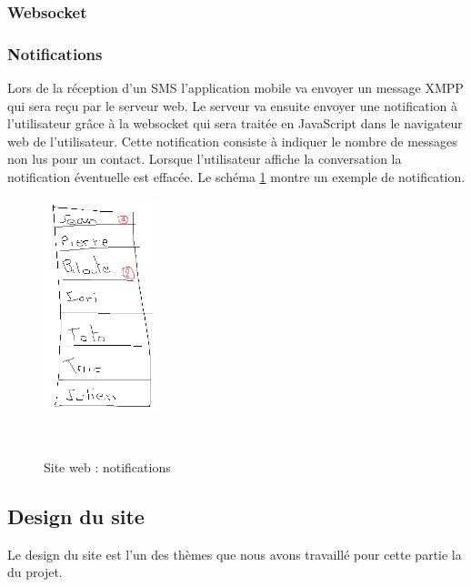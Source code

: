 \subsubsection{Websocket}



\subsubsection{Notifications}

Lors de la réception d'un SMS l'application mobile va envoyer un message XMPP qui sera reçu par le serveur web.
Le serveur va ensuite envoyer une notification à l'utilisateur grâce à la websocket qui sera traitée en JavaScript dans le navigateur web de l'utilisateur.
Cette notification consiste à indiquer le nombre de messages non lus pour un contact.
Lorsque l'utilisateur affiche la conversation la notification éventuelle est effacée.
Le schéma \ref{siteWeb_notifications} montre un exemple de notification.
\begin{figure}[!h]
	\center
	\includegraphics[width=0.3\textwidth]{img/siteWeb_notifications.png}
	\caption{Site web : notifications}
	\label{siteWeb_notifications}
~~\\
\end{figure}


\subsection{Design du site}

Le design du site est l'un des thèmes que nous avons travaillé pour cette partie la du projet.

